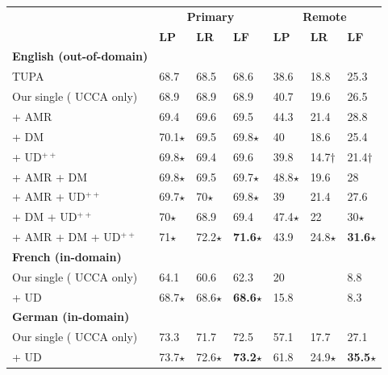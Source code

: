 \documentclass[a0,portrait]{a0poster}
\begin{document}
\begin{multicols}{2}
\begin{center}
\vspace{-1cm}
\setlength\tabcolsep{1cm}
\begin{tabular}{l|lll|lll}
& \multicolumn{3}{c|}{\bf\small Primary} & \multicolumn{3}{c}{\bf\small Remote} \\
& \textbf{\small LP} & \textbf{\small LR} & \textbf{LF}
& \textbf{\small LP} & \textbf{\small LR} & \textbf{LF} \\
\hline
\bf English (out-of-domain) & \\
TUPA \cite{hershcovich2017a}
& 68.7 & 68.5 & \large 68.6 & 38.6 & 18.8 & \large 25.3 \\
Our single ({\color{Indigo} UCCA} only)
& 68.9 & 68.9 & \large 68.9 & 40.7 & 19.6 & \large 26.5 \\
\cline{1-1}
+ \color{DarkGreen} AMR
& 69.4 & 69.6 & \large 69.5 & 44.3 & 21.4 & \large 28.8 \\
+ \color{DarkRed} DM
& 70.1$\star$ & 69.5 & {\large 69.8}$\star$ & 40 & 18.6 & \large 25.4 \\
+ \color{DarkBlue} UD$^{++}$
& 69.8$\star$ & 69.4 & \large 69.6 & 39.8 & 14.7$\dagger$ & {\large 21.4}$\dagger$ \\
+ {\color{DarkGreen} AMR} + \color{DarkRed} DM
& 69.8$\star$ & 69.5 & {\large 69.7}$\star$ & 48.8$\star$ & 19.6 & \large 28 \\
+ {\color{DarkGreen} AMR} + \color{DarkBlue} UD$^{++}$
& 69.7$\star$ & 70$\star$ & {\large 69.8}$\star$ & 39 & 21.4 & \large 27.6 \\
+ {\color{DarkRed} DM} + \color{DarkBlue} UD$^{++}$
& 70$\star$ & 68.9 & \large 69.4 & 47.4$\star$ & 22 & {\large 30}$\star$ \\
+ {\color{DarkGreen} AMR} + {\color{DarkRed} DM} + \color{DarkBlue} UD$^{++}$
& 71$\star$ & 72.2$\star$ & {\large \textbf{71.6}}$\star$ & 43.9 & 24.8$\star$ & {\large \textbf{31.6}}$\star$ \\
\hline
\bf French (in-domain) & \\
Our single ({\color{Indigo} UCCA} only) & 64.1 & 60.6 & \large 62.3 & 20 & \enskip 5.7 & \enskip \large 8.8 \\
+ \color{DarkBlue} UD & 68.7$\star$ & 68.6$\star$ & {\large \textbf{68.6}}$\star$ & 15.8 & \enskip 5.7 & \enskip \large 8.3 \\
\hline
\bf German (in-domain) & \\
Our single ({\color{Indigo} UCCA} only) & 73.3 & 71.7 & \large 72.5 & 57.1 & 17.7 & \large 27.1 \\
+ \color{DarkBlue} UD & 73.7$\star$ & 72.6$\star$ & {\large \textbf{73.2}}$\star$ & 61.8 & 24.9$\star$ & {\large \textbf{35.5}}$\star$
\end{tabular}
\end{center}


\end{multicols}
\end{document}
